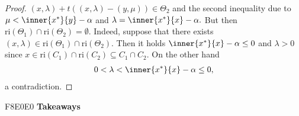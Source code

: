 \begin{proof}
$
  (x,\lambda)
  +
  t
  (
  (x,\lambda)
  -
  (y,\mu)
  )
  \in \Theta_2
$
and the second inequality due to
$
      \mu    
      <
      \inner{x^*}{y} - \alpha
$
and
$
      \lambda
      =
      \inner{x^*}{x} - \alpha
      .
$
But then 
$
\mathrm{ri}(\Theta_1)\cap\mathrm{ri}(\Theta_2)=\emptyset
.
$
Indeed, suppose that there exists 
$
  (x,\lambda)
  \in
  \mathrm{ri}(\Theta_1)\cap\mathrm{ri}(\Theta_2)
  .
$
Then it holds
$
  \inner{x^*}{x}
  -
  \alpha
  \le
  0
$
and $\lambda>0$
since 
$
 x
 \in
  \mathrm{ri}(C_1)\cap\mathrm{ri}(C_2)
  \subseteq
  C_1\cap C_2.
$
On the other hand
\begin{gather}
  0
  <
  \lambda
  <
  \inner{x^*}{x}
  -
  \alpha
  \le
  0
  ,
\end{gather}
a contradiction.
\end{proof}
\begin{colbox}{F8E0E0}
\textbf{Takeaways} \lipsum[1] %
\end{colbox}
